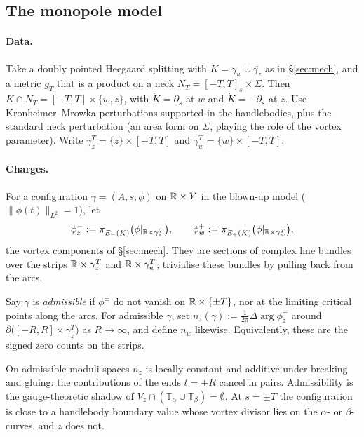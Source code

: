 \subsection{The monopole model}\label{subsec:monopole}
\paragraph{Data.}
Take a doubly pointed Heegaard splitting with $K=\gamma_w\cup\overline{\gamma_z}$ as in \S\ref{sec:mech}, and a metric
$g_T$ that is a product on a neck $N_T=[-T,T]_s\times\Sigma$.  Then $K\cap N_T=[-T,T]\times\{w,z\}$, with $\dot K=\partial_s$ at $w$
and $\dot K=-\partial_s$ at $z$.  Use Kronheimer--Mrowka perturbations \cite{KM-book} supported in the handlebodies, plus the standard
neck perturbation (an area form on $\Sigma$, playing the role of the vortex parameter).  Write
$\gamma_z^T=\{z\}\times[-T,T]$ and $\gamma_w^T=\{w\}\times[-T,T]$.

\paragraph{Charges.}
For a configuration $\gamma=(A,s,\phi)$ on $\mathbb{R}\times Y$ in the blown-up model ($\|\phi(t)\|_{L^2}=1$), let
\[
\phi^-_z:=\pi_{E_-(\dot K)}\big(\phi|_{\mathbb{R}\times\gamma_z^T}\big),\qquad
\phi^+_w:=\pi_{E_+(\dot K)}\big(\phi|_{\mathbb{R}\times\gamma_w^T}\big),
\]
the vortex components of \S\ref{sec:mech}.  They are sections of complex line bundles over the strips
$\mathbb{R}\times\gamma^T_{z}$ and $\mathbb{R}\times\gamma^T_{w}$; trivialise these bundles by pulling back from the arcs.

\begin{definition}[charges]
Say $\gamma$ is \emph{admissible} if $\phi^\pm$ do not vanish on $\mathbb{R}\times\{\pm T\}$, nor at the limiting critical points along
the arcs.  For admissible $\gamma$, set $n_z(\gamma):=\frac1{2\pi}\Delta\arg\phi^-_z$ around $\partial\big([-R,R]\times\gamma^T_z\big)$
as $R\to\infty$, and define $n_w$ likewise.  Equivalently, these are the signed zero counts on the strips.
\end{definition}
On admissible moduli spaces $n_z$ is locally constant and additive under breaking and gluing: the contributions of the
ends $t=\pm R$ cancel in pairs.  Admissibility is the gauge-theoretic shadow of $V_z\cap(\mathbb T_\alpha\cup\mathbb T_\beta)=\emptyset$.
At $s=\pm T$ the configuration is close to a handlebody boundary value whose vortex divisor lies on the $\alpha$- or
$\beta$-curves, and $z$ does not.

